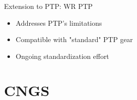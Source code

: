\documentclass[compress,red]{beamer}
\begin{document}
\begin{frame}{Extension to PTP: WR PTP}
	\begin{itemize}
	  \item Addresses PTP's limitations
	  \item Compatible with "standard" PTP gear
	  \item Ongoing standardization effort
	\end{itemize}
\end{frame}
\section{CNGS}
\end{document}
